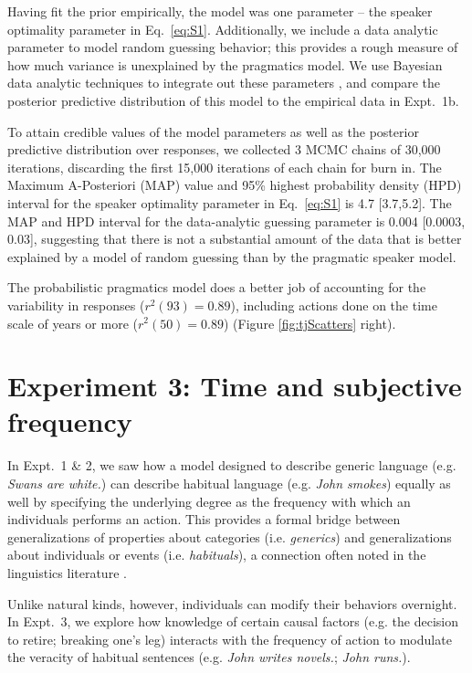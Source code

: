 \documentclass[10pt,letterpaper]{article}
\begin{document}
Having fit the prior empirically, the model was one parameter -- the speaker optimality parameter in Eq.~\ref{eq:S1}. 
Additionally, we include a data analytic parameter to model random guessing behavior; this provides a rough measure of how much variance is unexplained by the pragmatics model. 
We use Bayesian data analytic techniques to integrate out these parameters \cite{LW2014}, and compare the posterior predictive distribution of this model to the empirical data in Expt.~1b.

To attain credible values of the model parameters as well as the posterior predictive distribution over responses, we collected 3 MCMC chains of 30,000 iterations, discarding the first 15,000 iterations of each chain for burn in.
The Maximum A-Posteriori (MAP) value and 95\% highest probability density (HPD) interval for the speaker optimality parameter in Eq.~\ref{eq:S1} is 4.7 [3.7,5.2].
The MAP and HPD interval for the data-analytic guessing parameter is 0.004 [0.0003, 0.03], suggesting that there is not a substantial amount of the data that is better explained by a model of random guessing than by the pragmatic speaker model.


The probabilistic pragmatics model does a better job of accounting for the variability in responses ($r^2(93) = 0.89$), including actions done on the time scale of years or more  ($r^2(50) = 0.89$) (Figure \ref{fig:tjScatters} right).


\section{Experiment 3: Time and subjective frequency}

In Expt.~1 \& 2, we saw how a model designed to describe generic language (e.g. \emph{Swans are white.}) can describe habitual language (e.g. \emph{John smokes}) equally as well by specifying the underlying degree as the frequency with which an individuals performs an action.
This provides a formal bridge between generalizations of properties about categories (i.e. \emph{generics}) and generalizations about individuals or events (i.e. \emph{habituals}), a connection often noted in the linguistics literature \cite{Carlson1977, Carlson2005, Cohen1999}. 

Unlike natural kinds, however, individuals can modify their behaviors overnight.  
In Expt.~3, we explore how knowledge of certain causal factors (e.g. the decision to retire; breaking one's leg) interacts with the frequency of action to modulate the veracity of habitual sentences (e.g. \emph{John writes novels.}; \emph{John runs.}).
\end{document}
